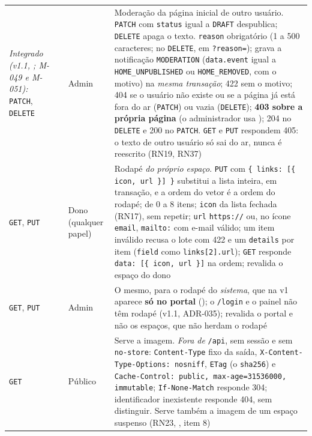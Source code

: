 \begin{longtable}{@{}L{1.5cm}L{4.1cm}L{2.1cm}L{6.1cm}@{}}
\emph{Integrado (v1.1, ; M-049 e M-051):} \texttt{PATCH}, \texttt{DELETE} &  & Admin & Moderação da página inicial de outro usuário. \texttt{PATCH} com \texttt{status} igual a \texttt{DRAFT} despublica; \texttt{DELETE} apaga o texto. \texttt{reason} obrigatório (1 a 500 caracteres; no \texttt{DELETE}, em \texttt{?reason=}); grava a notificação \texttt{MODERATION} (\texttt{data.event} igual a \texttt{HOME\_UNPUBLISHED} ou \texttt{HOME\_REMOVED}, com o motivo) na \emph{mesma transação}; 422 sem o motivo; 404 se o usuário não existe ou se a página já está fora do ar (\texttt{PATCH}) ou vazia (\texttt{DELETE}); \textbf{403 sobre a própria página} (o administrador usa ); 204 no \texttt{DELETE} e 200 no \texttt{PATCH}. \texttt{GET} e \texttt{PUT} respondem 405: o texto de outro usuário só sai do ar, nunca é reescrito (RN19, RN37)\\[1pt]
\texttt{GET}, \texttt{PUT} &  & Dono (qualquer papel) & Rodapé \emph{do próprio espaço}. \texttt{PUT} com \texttt{\{ links: [\{ icon, url \}] \}} substitui a lista inteira, em transação, e a ordem do vetor é a ordem do rodapé; de 0 a 8 itens; \texttt{icon} da lista fechada (RN17), sem repetir; \texttt{url} \texttt{https://} ou, no ícone \texttt{email}, \texttt{mailto:} com e-mail válido; um item inválido recusa o lote com 422  e um \texttt{details} por item (\texttt{field} como \texttt{links[2].url}); \texttt{GET} responde \texttt{data: [\{ icon, url \}]} na ordem; revalida o espaço do dono\\[1pt]
\texttt{GET}, \texttt{PUT} &  & Admin & O mesmo, para o rodapé do \emph{sistema}, que na v1 aparece \textbf{só no portal} (\arq{/}); o \texttt{/login} e o painel não têm rodapé (v1.1, ADR-035); revalida o portal e não os espaços, que não herdam o rodapé\\[1pt]
\texttt{GET} &  & Público & Serve a imagem. \emph{Fora de} \texttt{/api}, sem sessão e sem \texttt{no-store}: \texttt{Content-Type} fixo da saída, \texttt{X-Content-Type-Options: nosniff}, \texttt{ETag} (o \texttt{sha256}) e \texttt{Cache-Control: public, max-age=31536000, immutable}; \texttt{If-None-Match} responde 304; identificador inexistente responde 404, sem distinguir. Serve também a imagem de um espaço suspenso (RN23, , item 8)\\[1pt]

\end{longtable}
